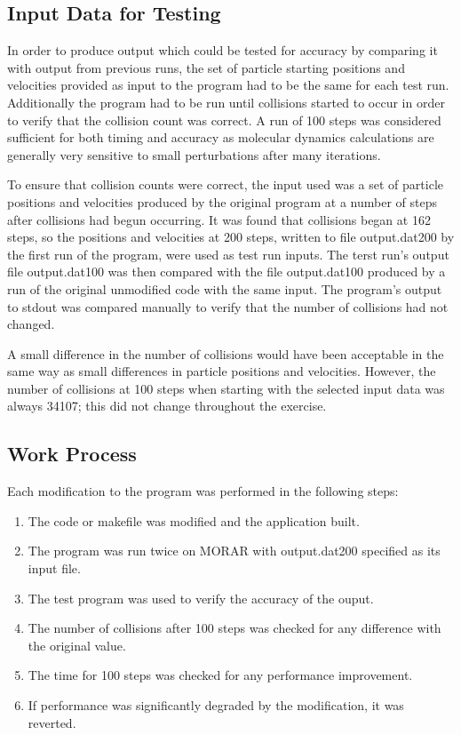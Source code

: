 \documentclass[11pt, oneside]{article}   %
\begin{document}
\subsection{Input Data for Testing}

In order to produce output which could be tested for accuracy by comparing it with output from previous runs, the set of particle starting positions and velocities provided as input to the program had to be the same for each test run.
Additionally the program had to be run until collisions started to occur in order to verify that the collision count was correct.
A run of 100 steps was considered sufficient for both timing and accuracy as molecular dynamics calculations are generally very sensitive to small perturbations after many iterations.  

To ensure that collision counts were correct, the input used was a set of particle positions and velocities produced by the original program at a number of steps after collisions had begun occurring.
It was found that collisions began at 162 steps, so the positions and velocities at 200 steps, written to file output.dat200 by the first run of the program, were used as test run inputs.
The terst run's output file output.dat100 was then compared with the file output.dat100 produced by a run of the original unmodified code with the same input.
The program's output to stdout was compared manually to verify that the number of collisions had not changed.

A small difference in the number of collisions would have been acceptable in the same way as small differences in particle positions and velocities.
However, the number of collisions at 100 steps when starting with the selected input data was always 34107; this did not change throughout the exercise.

\subsection{Work Process}
Each modification to the program was performed in the following steps:

\begin{enumerate}
	\item The code or makefile was modified and the application built.
	\item The program was run twice on MORAR with output.dat200 specified as its input file.
	\item The test program was used to verify the accuracy of the ouput.
	\item The number of collisions after 100 steps was checked for any difference with the original value.
	\item The time for 100 steps was checked for any performance improvement.
	\item If performance was significantly degraded by the modification, it was reverted. 
\end{enumerate}
\end{document}

